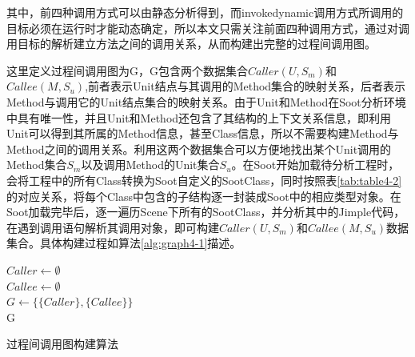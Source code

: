 其中，前四种调用方式可以由静态分析得到，而invokedynamic调用方式所调用的目标必须在运行时才能动态确定，所以本文只需关注前面四种调用方式，通过对调用目标的解析建立方法之间的调用关系，从而构建出完整的过程间调用图。

这里定义过程间调用图为G，G包含两个数据集合$Caller(U,S_m)$和$Callee(M,S_u)$,前者表示Unit结点与其调用的Method集合的映射关系，后者表示Method与调用它的Unit结点集合的映射关系。由于Unit和Method在Soot分析环境中具有唯一性，并且Unit和Method还包含了其结构的上下文关系信息，即利用Unit可以得到其所属的Method信息，甚至Class信息，所以不需要构建Method与Method之间的调用关系。利用这两个数据集合可以方便地找出某个Unit调用的Method集合$S_m$以及调用Method的Unit集合$S_u$。在Soot开始加载待分析工程时，会将工程中的所有Class转换为Soot自定义的SootClass，同时按照表\ref{tab:table4-2}的对应关系，将每个Class中包含的子结构逐一封装成Soot中的相应类型对象。在Soot加载完毕后，逐一遍历Scene下所有的SootClass，并分析其中的Jimple代码，在遇到调用语句解析其调用对象，即可构建$Caller(U,S_m)$和$Callee(M,S_u)$数据集合。具体构建过程如算法\ref{alg:graph4-1}描述。

\begin{algorithm}%
	
	$Caller \leftarrow \emptyset$ \\
	$Callee \leftarrow \emptyset$ \\
	$G \leftarrow \{\{Caller\},\{Callee\}\}$ \\
	\Return G
	\caption{过程间调用图构建算法}
	\label{alg:graph4-1}
\end{algorithm}

